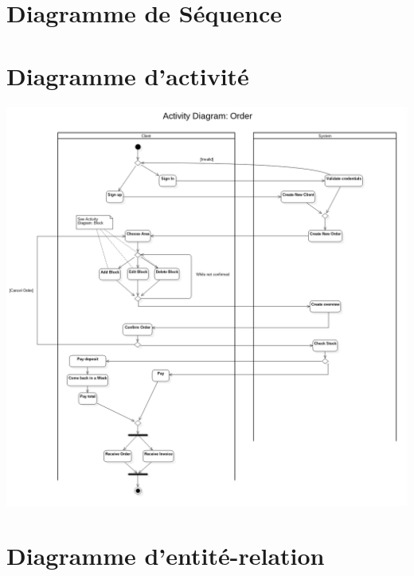 \documentclass{ecam}
\begin{document}
\section{Diagramme de Séquence}

\section{Diagramme d'activité}

\begin{center}
\includegraphics[angle=0,scale=0.3]{../images/activity-diagram.png}
\end{center}

\section{Diagramme d'entité-relation}
\end{document}
